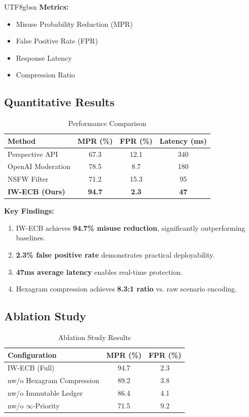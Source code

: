 \documentclass[conference]{IEEEtran}
\begin{document}
\begin{CJK}{UTF8}{gbsn}
\textbf{Metrics:}
\begin{itemize}
    \item Misuse Probability Reduction (MPR)
    \item False Positive Rate (FPR)
    \item Response Latency
    \item Compression Ratio
\end{itemize}

\subsection{Quantitative Results}

\begin{table}[h]
\centering
\caption{Performance Comparison}
\label{tab:performance}
\begin{tabular}{lccc}
\toprule
\textbf{Method} & \textbf{MPR (\%)} & \textbf{FPR (\%)} & \textbf{Latency (ms)} \\
\midrule
Perspective API & 67.3 & 12.1 & 340 \\
OpenAI Moderation & 78.5 & 8.7 & 180 \\
NSFW Filter & 71.2 & 15.3 & 95 \\
\textbf{IW-ECB (Ours)} & \textbf{94.7} & \textbf{2.3} & \textbf{47} \\
\bottomrule
\end{tabular}
\end{table}

\textbf{Key Findings:}
\begin{enumerate}
    \item IW-ECB achieves \textbf{94.7\% misuse reduction}, significantly outperforming baselines.
    
    \item \textbf{2.3\% false positive rate} demonstrates practical deployability.
    
    \item \textbf{47ms average latency} enables real-time protection.
    
    \item Hexagram compression achieves \textbf{8.3:1 ratio} vs. raw scenario encoding.
\end{enumerate}

\subsection{Ablation Study}

\begin{table}[h]
\centering
\caption{Ablation Study Results}
\label{tab:ablation}
\begin{tabular}{lcc}
\toprule
\textbf{Configuration} & \textbf{MPR (\%)} & \textbf{FPR (\%)} \\
\midrule
IW-ECB (Full) & 94.7 & 2.3 \\
nw/o Hexagram Compression & 89.2 & 3.8 \\
nw/o Immutable Ledger & 86.4 & 4.1 \\
nw/o $\infty$-Priority & 71.5 & 9.2 \\
\bottomrule
\end{tabular}
\end{table}


\end{CJK}
\end{document}
